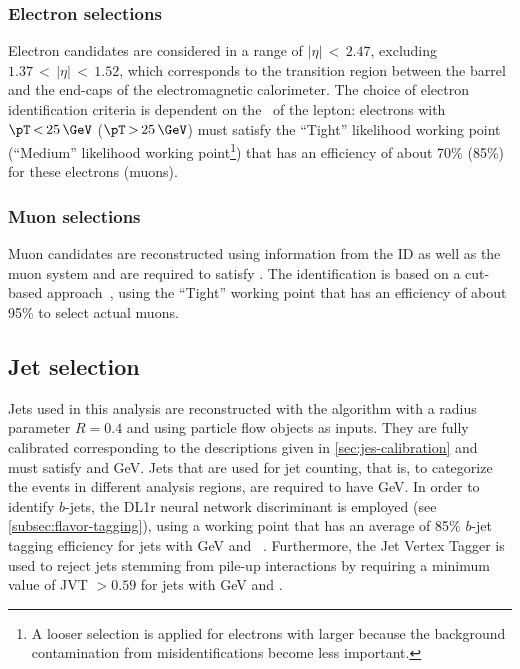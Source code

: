 \subsubsection{Electron selections}
Electron candidates are considered in a range of $|\eta| \,{<}\, 2.47$, excluding $1.37\,{<}\,|\eta|\,{<}\,1.52$, which corresponds to the transition region between the barrel and the end-caps of the electromagnetic calorimeter.
The choice of electron identification criteria is dependent on the \pT\ of the lepton: electrons with $\pT \,{<}\,25\,\GeV$ ($\pT\,{>}\,25\,\GeV$) must satisfy the ``Tight'' likelihood working point (``Medium'' likelihood working point\footnote{A looser selection is applied for electrons with larger \pT because the background contamination from misidentifications become less important.}) that has an efficiency of about 70\% (85\%) for these electrons (muons).~\cite{EGAM-2018-01}

\subsubsection{Muon selections}
Muon candidates are reconstructed using information from the ID as well as the muon system and are required to satisfy .
The identification is based on a cut-based approach~\cite{MUON-2018-03}, using the ``Tight'' working point that has an efficiency of about 95\% to select actual muons.

\subsection{Jet selection}
Jets used in this analysis are reconstructed with the \antikt algorithm with a radius parameter $R = 0.4$ and using particle flow objects as inputs.
They are fully calibrated corresponding to the descriptions given in \cref{sec:jes-calibration} and must satisfy  and GeV.
Jets that are used for jet counting, that is, to categorize the events in different analysis regions, are required to have GeV.
In order to identify $b$-jets, the DL1r neural network discriminant is employed (see \cref{subsec:flavor-tagging}), using a working point that has an average of 85\% $b$-jet tagging efficiency for jets with GeV and ~\cite{FTAG-2018-01}.
Furthermore, the Jet Vertex Tagger is used to reject jets stemming from pile-up interactions by requiring a minimum value of JVT $> 0.59$ for jets with GeV and .


